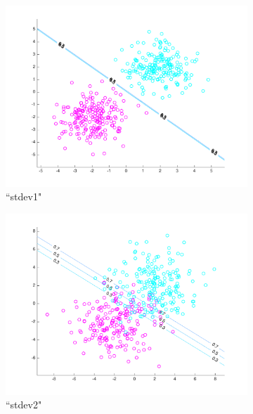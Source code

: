 \begin{figure}[h!]
\centering
    \begin{subfigure}[b]{0.22\textwidth}
	\includegraphics[scale=0.25]{hw2_1_stdev1_a_0.pdf}
	\caption{``stdev1"}\label{fig:data_stdev1a}
    \end{subfigure}
    \quad
    \begin{subfigure}[b]{0.22\textwidth}
	\includegraphics[scale=0.25]{hw2_1_stdev2_a_0.pdf}
	\caption{``stdev2"}\label{fig:data_stdev2a}
	\end{subfigure}
	\quad	    
    \begin{subfigure}[b]{0.22\textwidth}

\end{subfigure}
\end{figure}
